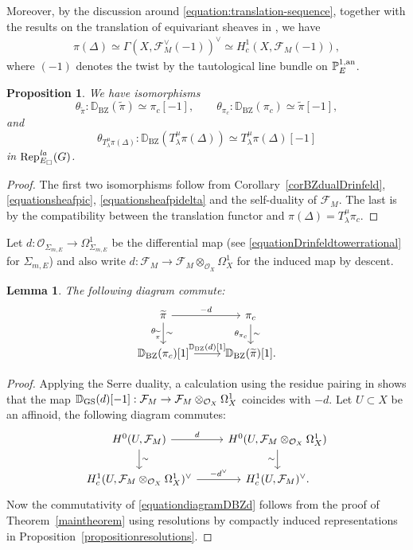 \documentclass[a4paper,10pt]{amsart}
\theoremstyle{remark}
\theoremstyle{definition}
\theoremstyle{plain}
\newtheorem{lemma}[theorem]{Lemma}
\newtheorem{proposition}[theorem]{Proposition}
\numberwithin{equation}{section}
\newcommand{\bbD}{{\mathbb D}}
\newcommand{\bbP}{{\mathbb P}}
\newcommand{\calF}{{\mathcal F}}
\newcommand{\calO}{{\mathcal O}}
\newcommand{\an}{{\rm an}}
\newcommand{\GS}{{\rm GS}}
\newcommand{\la}{{\it la}}
\newcommand{\Rep}{{\rm Rep}}
\newcommand{\BZ}{\ensuremath{\mathrm{BZ}}}
\begin{document}
Moreover, by the discussion around \eqref{equation:translation-sequence}, together with the results on the translation of equivariant sheaves in \cite[\S~2]{su2025locally}, we have
\begin{align}\label{equationsheafpidelta}
	\pi(\Delta)\simeq \Gamma(X,\calF_M^\vee(-1))^{\vee}\simeq H_c^1(X,\calF_M(-1)),
\end{align}
where $(-1)$ denotes the twist by the tautological line bundle on $\bbP^{1,\an}_E$.
\begin{proposition}\label{prop:BZ-pic-pitilde}
We have isomorphisms
\[
 \theta_{\widetilde{\pi}}:\bbD_{\BZ}(\widetilde\pi)\simeq\pi_c[-1],
 \qquad \theta_{\pi_c}:\bbD_{\BZ}(\pi_c)\simeq\widetilde\pi[-1],
\]
and 
\[\theta_{T_{\lambda}^{\mu}\pi(\Delta)}:\bbD_{\BZ}(T_{\lambda}^{\mu}\pi(\Delta))\simeq T_{\lambda}^{\mu}\pi(\Delta)[-1]\]
in $\Rep^{\la}_{E_\square}(G)$.
\end{proposition}
\begin{proof}
The first two isomorphisms follow from Corollary~\ref{corBZdualDrinfeld}, \eqref{equationsheafpic}, \eqref{equationsheafpidelta} and the self-duality of $\calF_M$. The last is by the compatibility between the translation functor and $\pi(\Delta)=T_{\lambda}^{\mu}\pi_c$. 
\end{proof}
Let $d:\calO_{\Sigma_{m,E}}\rightarrow \Omega_{\Sigma_{m,E}}^1$ be the differential map (see \eqref{equationDrinfeldtowerrational} for $\Sigma_{m,E}$) and also write $d:\calF_M\rightarrow \calF_M\otimes_{\calO_X}\Omega_X^1$ for the induced map by descent.
\begin{lemma}\label{lemmaDBZd}
	The following diagram commute:
	\begin{equation}\label{equationdiagramDBZd}
		\begin{tikzcd}
			\widetilde{\pi}\arrow["\sim",d,"{\theta_{\widetilde{\pi}}}"']\arrow[r,"-d"]&\pi_c\arrow["\sim",d,"{\theta_{\pi_c}}"']\\
			\bbD_{\BZ}(\pi_c)[1]\arrow[r,"{\bbD_{\BZ}(d)[1]}"]&\bbD_{\BZ}(\widetilde{\pi})[1].
		\end{tikzcd}
	\end{equation}
\end{lemma}
\begin{proof}
	Applying the Serre duality, a calculation using the residue pairing in \cite[Lem.~2.16]{rodrigues2022solid} shows that the map $\bbD_{\GS}(d)[-1]:\calF_M\rightarrow \calF_M\otimes_{\calO_X}\Omega_X^1$ coincides with $-d$. Let $U\subset X$ be an affinoid, the following diagram commutes:
	\[\begin{tikzcd}H^0(U,\calF_M) \arrow[r,"d"] \arrow[d,"\sim"] & H^0(U,\calF_M\otimes_{\calO_X}\Omega_X^1) \arrow[d,"\sim"']\\ 
		H_c^1(U,\calF_M\otimes_{\calO_X}\Omega_X^1)^{\vee} \arrow[r,"-d^{\vee}"] & H_c^1(U,\calF_M)^{\vee}.
	\end{tikzcd}
	\]
	Now the commutativity of \eqref{equationdiagramDBZd} follows from the proof of Theorem~\ref{maintheorem} using resolutions by compactly induced representations in Proposition~\ref{propositionresolutions}. 
\end{proof}
\end{document}
